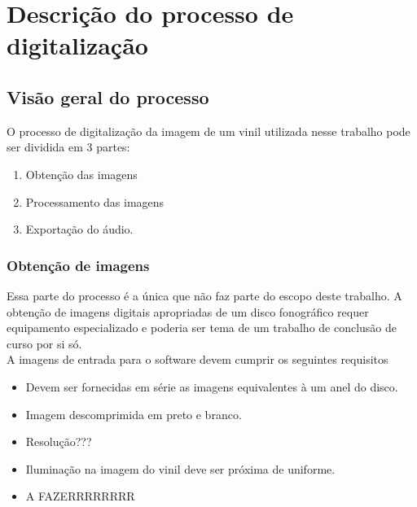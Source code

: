 \documentclass[
	12pt,				%
	openright,			%
	twoside,			%
	a4paper,			%
	english,			%
	french,				%
	spanish,			%
	brazil				%
	]{abntex2}
\begin{document}


\part{Descrição do processo de digitalização}

\chapter{Visão geral do processo}

O processo de digitalização da imagem de um vinil utilizada nesse trabalho pode ser dividida em 3 partes:\\

\begin{enumerate}
\item Obtenção das imagens
\item Processamento das imagens
\item Exportação do áudio.
\end{enumerate}



\section{Obtenção de imagens}
Essa parte do processo é a única que não faz parte do escopo deste trabalho. A obtenção de imagens digitais apropriadas de um disco fonográfico requer equipamento especializado e poderia ser tema de um trabalho de conclusão de curso por si só.\\
A imagens de entrada para o software devem cumprir os seguintes requisitos
\begin{itemize}	
\item Devem ser fornecidas em série as imagens equivalentes à um anel do disco.
\item Imagem descomprimida em preto e branco. 
\item Resolução???
\item Iluminação na imagem do vinil deve ser próxima de uniforme.
\item A FAZERRRRRRRR
\end{itemize}
\end{document}

